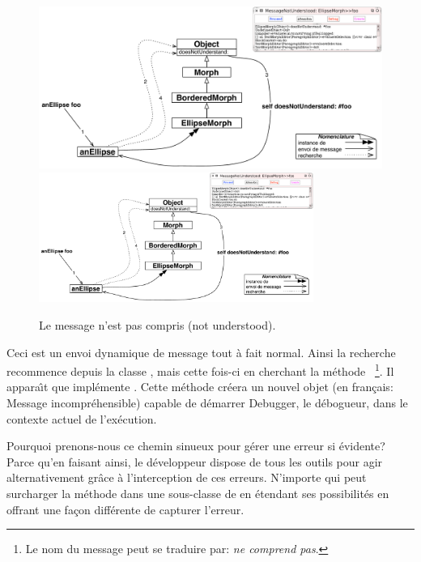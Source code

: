 \documentclass[a4paper,10pt,twoside]{book}
\begin{document}
\begin{figure}[htb]
\begin{center}
\ifluluelse
	{\includegraphics[width=\textwidth]{fooNotFound}}
	{\includegraphics[width=0.8\textwidth]{fooNotFound}}
\caption{Le message  n'est pas compris (not understood).\label{fig:fooNotFound}}
\end{center}
\end{figure}

Ceci est un envoi dynamique de message tout \`a fait normal. Ainsi
la recherche recommence depuis la classe , mais
cette fois-ci en cherchant la m\'ethode ~\footnote{Le nom du message peut se traduire par: \emph{ne comprend pas}.}.
Il appara\^{\i}t que  impl\'emente .
Cette m\'ethode cr\'eera un nouvel objet  (en fran\c{c}ais: Message incompr\'ehensible) capable de d\'emarrer Debugger, le d\'ebogueur, dans le contexte actuel de l'ex\'ecution.

Pourquoi prenons-nous ce chemin sinueux pour g\'erer une erreur si \'evidente?
Parce qu'en faisant ainsi, le d\'eveloppeur dispose de tous les outils pour
agir alternativement gr\^ace \`a l'interception de ces erreurs.
N'importe qui peut surcharger la m\'ethode  
dans une sous-classe de  en \'etendant ses possibilit\'es en
offrant une fa\c{c}on diff\'erente de capturer l'erreur.
\end{document}
